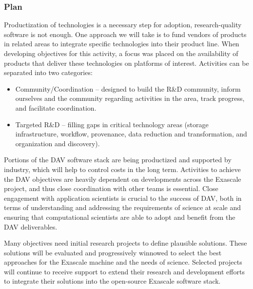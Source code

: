 \subsubsection{Plan}
Productization of technologies is a necessary step for adoption, research-quality software is not enough. One approach we will take is to fund vendors of products in related areas to integrate specific technologies into their product line. When developing objectives for this activity, a focus was placed on the availability of products that deliver these technologies on platforms of interest. Activities can be separated into two categories:
\begin{itemize}
\item Community/Coordination – designed to build the R\&D community, inform ourselves and the community regarding activities in the area, track progress, and facilitate coordination.
\item Targeted R\&D – filling gaps in critical technology areas (storage infrastructure, workflow, provenance, data reduction and transformation, and organization and discovery).
\end{itemize}

Portions of the DAV software stack are being productized and supported by industry, which will help to control costs in the long term. Activities to achieve the DAV objectives are heavily dependent on developments across the Exascale project, and thus close coordination with other teams is essential. Close engagement with application scientists is crucial to the success of DAV, both in terms of understanding and addressing the requirements of science at scale and ensuring that computational scientists are able to adopt and benefit from the DAV deliverables.

Many objectives need initial research projects to define plausible solutions. These solutions will be evaluated and progressively winnowed to select the best approaches for the Exascale machine and the needs of science. Selected projects will continue to receive support to extend their research and development efforts to integrate their solutions into the open-source Exascale software stack. 

